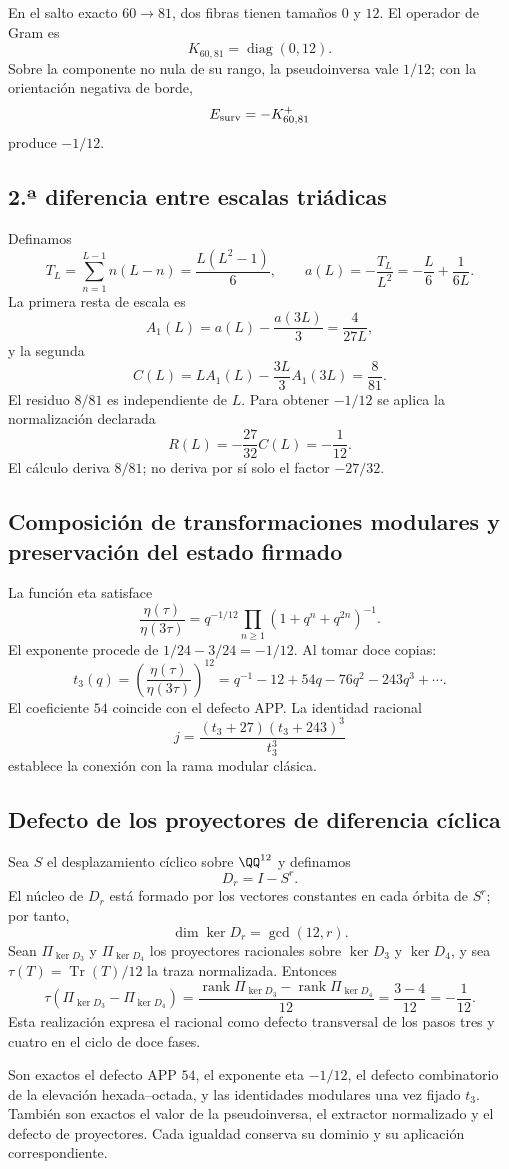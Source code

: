 En el salto exacto \(60\to81\), dos fibras tienen tamaños \(0\) y
\(12\). El operador de Gram es
\[
K_{60,81}=\operatorname{diag}(0,12).
\]
Sobre la componente no nula de su rango, la pseudoinversa vale \(1/12\); con la orientación
negativa de borde,
\[
E_{\rm surv}=-K_{60,81}^{+}
\]
produce \(-1/12\).

\subsection{2.ª diferencia entre escalas triádicas}
\label{sec:c12-segunda-diferencia-triadica}

Definamos
\[
T_L=\sum_{n=1}^{L-1}n(L-n)=\frac{L(L^2-1)}6,
\qquad
a(L)=-\frac{T_L}{L^2}=-\frac L6+\frac1{6L}.
\]
La primera resta de escala es
\[
A_1(L)=a(L)-\frac{a(3L)}3=\frac4{27L},
\]
y la segunda
\[
C(L)=LA_1(L)-\frac{3L}{3}A_1(3L)=\frac8{81}.
\]
El residuo \(8/81\) es independiente de \(L\). Para obtener
\(-1/12\) se aplica la normalización declarada
\[
R(L)=-\frac{27}{32}C(L)=-\frac1{12}.
\]
El cálculo deriva \(8/81\); no deriva por sí solo el factor \(-27/32\).

\subsection{Composición de transformaciones modulares y preservación del estado firmado}

La función eta satisface
\[
\frac{\eta(\tau)}{\eta(3\tau)}
=q^{-1/12}\prod_{n\ge1}(1+q^n+q^{2n})^{-1}.
\]
El exponente procede de \(1/24-3/24=-1/12\). Al tomar doce copias:
\[
t_3(q)=\left(\frac{\eta(\tau)}{\eta(3\tau)}\right)^{12}
=q^{-1}-12+54q-76q^2-243q^3+\cdots.
\]
El coeficiente \(54\) coincide con el defecto APP\@. La identidad racional
\[
j=\frac{(t_3+27)(t_3+243)^3}{t_3^3}
\]
establece la conexión con la rama modular clásica.

\subsection{Defecto de los proyectores de diferencia cíclica}

Sea \(S\) el desplazamiento cíclico sobre \(\QQ^{12}\) y definamos
\[
 D_r=I-S^r.
\]
El núcleo de \(D_r\) está formado por los vectores constantes en cada órbita
de \(S^r\); por tanto,
\[
 \dim\ker D_r=\gcd(12,r).
\]
Sean \(\Pi_{\ker D_3}\) y \(\Pi_{\ker D_4}\) los proyectores racionales sobre
\(\ker D_3\) y \(\ker D_4\), y sea
\(\tau(T)=\operatorname{Tr}(T)/12\) la traza normalizada. Entonces
\[
 \boxed{
 \tau(\Pi_{\ker D_3}-\Pi_{\ker D_4})
 =\frac{\operatorname{rank}\Pi_{\ker D_3}
       -\operatorname{rank}\Pi_{\ker D_4}}{12}
 =\frac{3-4}{12}
 =-\frac1{12}.}
\]
Esta realización expresa el racional como defecto transversal de los pasos
tres y cuatro en el ciclo de doce fases.

\begin{remark}
Son exactos el defecto APP \(54\), el exponente eta \(-1/12\), el defecto
combinatorio de la elevación hexada--octada, y las
identidades modulares una vez fijado \(t_3\). También son exactos el valor
de la pseudoinversa, el extractor normalizado y el defecto de proyectores.
Cada igualdad conserva su dominio y su aplicación correspondiente.
\end{remark}
